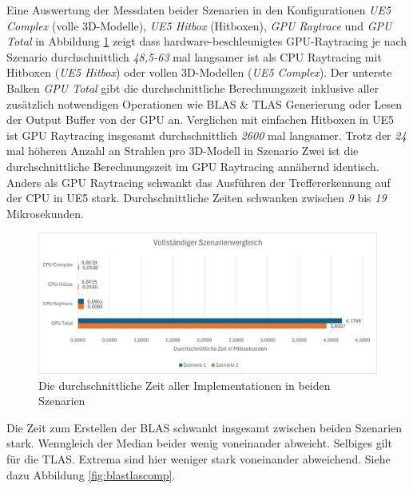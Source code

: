 \documentclass[11pt]{scrartcl}
\begin{document}
	Eine Auswertung der Messdaten beider Szenarien in den Konfigurationen \textit{UE5 Complex} (volle 3D-Modelle), \textit{UE5 Hitbox} (Hitboxen), \textit{GPU Raytrace} und \textit{GPU Total} in Abbildung \ref{fig:fullcompaverage} zeigt dass hardware-beschleunigtes GPU-Raytracing je nach Szenario durchschnittlich \textit{48,5-63} mal langsamer ist als CPU Raytracing mit Hitboxen (\textit{UE5 Hitbox}) oder vollen 3D-Modellen (\textit{UE5 Complex}). Der unterste Balken \textit{GPU Total} gibt die durchschnittliche Berechnungszeit inklusive aller zusätzlich notwendigen Operationen wie BLAS \& TLAS Generierung oder Lesen der Output Buffer von der GPU an. Verglichen mit einfachen Hitboxen in UE5 ist GPU Raytracing insgesamt durchschnittlich \textit{2600} mal langsamer. Trotz der \textit{24} mal höheren Anzahl an Strahlen pro 3D-Modell in Szenario Zwei ist die durchschnittliche Berechnungszeit im GPU Raytracing annähernd identisch. Anders als GPU Raytracing schwankt das Ausführen der Treffererkennung auf der CPU in UE5 stark. Durchschnittliche Zeiten schwanken zwischen \textit{9} bis \textit{19} Mikrosekunden.
	
	\begin{figure}[h!]
		\centering
		\includegraphics[width=0.7\linewidth]{Figures/full_comp_average}
		\caption[Vollständiger Szenarienvergleich Durchschnittszeit]{Die durchschnittliche Zeit aller Implementationen in beiden Szenarien}
		\label{fig:fullcompaverage}
	\end{figure}
	
	\pagebreak
	
	Die Zeit zum Erstellen der BLAS schwankt insgesamt zwischen beiden Szenarien stark. Wenngleich der Median beider wenig voneinander abweicht. Selbiges gilt für die TLAS. Extrema sind hier weniger stark voneinander abweichend. Siehe dazu Abbildung \ref{fig:blastlascomp}.
	
\end{document}

